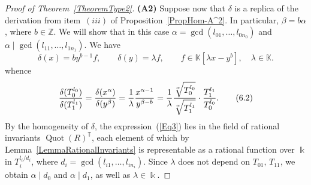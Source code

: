 \documentclass[a4paper,reqno,12pt]{amsart}
\theoremstyle{plain}
\theoremstyle{definition}
\theoremstyle{plain}
\theoremstyle{remark}
\DeclareMathOperator{\Quot}{Quot}
\newcommand{\KK}{\mathbb K}
\newcommand{\TT}{\mathbb{T}}
\newcommand{\ZZ}{\mathbb Z}
\begin{document}
\begin{proof}[Proof of Theorem~\ref{TheoremType2}]
    \textbf{(A2)}
    Suppose now that $\delta$ is a replica of the derivation from item~$(iii)$ of Proposition~\ref{PropHom-A^2}. In particular, $\beta=b\alpha$, where $b\in\ZZ$. We will show that in this case $\alpha = \gcd(l_{01},\ldots,l_{0n_0})$ and $\alpha\mid\gcd(l_{11},\ldots,l_{1n_1})$.
    We have
    \begin{equation}\label{Eq0}
        \delta(x)=by^{b-1}f,\qquad\delta(y)=\lambda f,\qquad f\in\KK[\lambda x-y^b],\quad\lambda\in\KK.
        \tag{6.1}
    \end{equation} whence
    \begin{equation}\label{Eq3}
        {\delta(T_0^{l_0})\over \delta(T_1^{l_1})}={\delta(x^\alpha)\over \delta(y^{\beta})} = {1\over\lambda}{x^{\alpha-1}\over y^{\beta-b}} ={1\over\lambda}{\sqrt[\alpha]{T_0^{l_0}}\over \sqrt[\alpha]{{T_1^{l_1}}}}\cdot{T_1^{l_1}\over T_0^{l_0}}.
        \tag{6.2}
    \end{equation}   
    By the homogeneity of $\delta$, the expression~(\ref{Eq3}) lies in the field of rational invariants $\Quot(R)^{\TT}$, each element of which by Lemma~\ref{LemmaRationalInvariants} is representable as a rational function over $\Bbbk$ in $T_i^{l_i/d_i}$, where $d_i=\gcd(l_{i1},\ldots,l_{in_i})$. Since $\lambda$ does not depend on $T_{01},\,T_{11}$, we obtain $\alpha\mid d_0$ and $\alpha\mid d_1$, as well as $\lambda\in\Bbbk$.


\end{proof}
\end{document}
